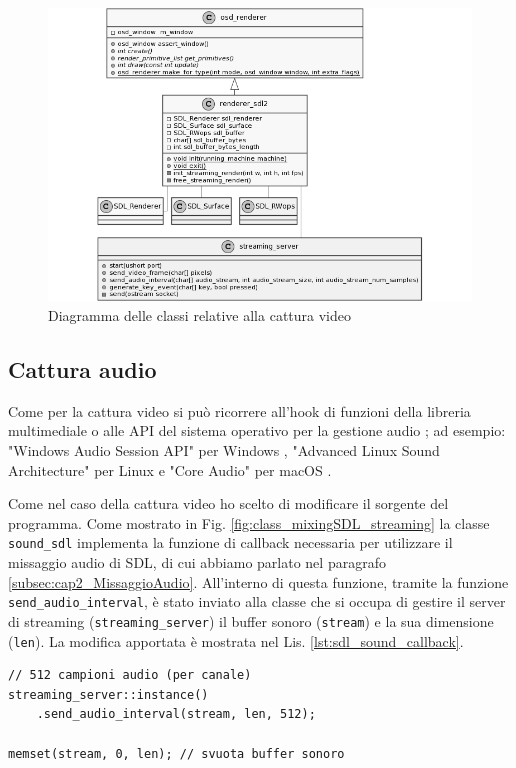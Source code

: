 \begin{figure}[H]
	\includegraphics[width=\linewidth]{immagini/class_renderingSDLFull_Streaming}
	\caption{Diagramma delle classi relative alla cattura video}
	\label{fig:class_renderingSDLFull_Streaming}
\end{figure}



\subsection{Cattura audio} \label{subsec:cap3_Audio}
Come per la cattura video si può ricorrere all'hook di funzioni della libreria multimediale o alle API del sistema operativo per la gestione audio \parencite{GamingAnywhere}; ad esempio: "Windows Audio Session API" per Windows \parencite{WASAPI}, "Advanced Linux Sound Architecture" per Linux \parencite{ALSA} e "Core Audio" per macOS \parencite{Core_Audio_api}.

Come nel caso della cattura video ho scelto di modificare il sorgente del programma. Come mostrato in Fig. \ref{fig:class_mixingSDL_streaming} la classe \verb|sound_sdl| implementa la funzione di callback necessaria per utilizzare il missaggio audio di SDL, di cui abbiamo parlato nel paragrafo \ref{subsec:cap2_MissaggioAudio}. All'interno di questa funzione, tramite la funzione \verb|send_audio_interval|, è stato inviato alla classe che si occupa di gestire il server di streaming (\verb|streaming_server|) il buffer sonoro (\verb|stream|) e la sua dimensione (\verb|len|). La modifica apportata è mostrata nel Lis. \ref{lst:sdl_sound_callback}.

\begin{lstlisting}[caption=Codice aggiunto per la cattura audio. File: \detokenize{osd/modules/sound/sdl_sound.cpp}, label={lst:sdl_sound_callback}]
// 512 campioni audio (per canale)
streaming_server::instance()
	.send_audio_interval(stream, len, 512);

memset(stream, 0, len); // svuota buffer sonoro
\end{lstlisting}


